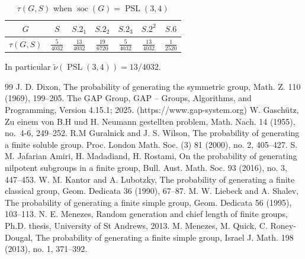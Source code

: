 \documentclass{amsart}
\DeclareMathOperator{\soc}{soc}
\DeclareMathOperator{\psl}{PSL}
\numberwithin{equation}{section}
\begin{document}
\begin{table}[h]
	\centering
	\renewcommand{\arraystretch}{1.4}
	\begin{tabular}{ccccccc}
		\toprule
		\textbf{$G$} & $S$ & $S.{2_1}$ & $S.{2_2}$ & $S.{2_3}$ & $S.2^2$ & $S.6$ \\
		\midrule
		\textbf{$\tau(G,S)$} & $\tfrac{5}{4032}$ & $\tfrac{13}{4032}$ & $\tfrac{19}{6720}$ & $\tfrac{5}{4032}$ & $\tfrac{13}{4032}$ & $\tfrac{1}{2520}$ \\
		\bottomrule
	\end{tabular}
	\caption{$\tau(G,S)$ when $\soc(G)=\psl(3,4)$}
\end{table}

\noindent In particular $\tilde\nu(\psl(3,4))=13/4032.$




	

\begin{thebibliography}{99}
	 J. D. Dixon, The probability of generating the symmetric group, Math.
	Z. 110 (1969), 199–205.
	The GAP Group, GAP -- Groups, Algorithms, and Programming, Version 4.15.1; 2025. (https://www.gap-system.org)
	W. Gasch{\"u}tz, Zu einem von B.H und H. Neumann gestellten
	problem, Math. Nach. 14 (1955), no.~4-6, 249--252.
 R.M	Guralnick and J. S. Wilson, 
	The probability of generating a finite soluble group.
	Proc. London Math. Soc. (3) 81 (2000), no. 2, 405–427.
	 S. M. Jafarian Amiri, H. Madadiand, H.
	Rostami, 
	On the probability of generating nilpotent subgroups in a finite group, 
	Bull. Aust. Math. Soc. 93 (2016), no. 3, 447–453.
	W. M. Kantor and A. Lubotzky, The probability of generating a finite classical group,
	Geom. Dedicata 36 (1990), 67–87.
	M. W. Liebeck and A. Shalev, The probability of generating a finite simple group, Geom.
	Dedicata 56 (1995), 103–113.
 N. E. Menezes, Random generation and chief length of finite groups, Ph.D. thesis, University
of St Andrews, 2013.
 M. Menezes, M. Quick, C. Roney-Dougal,
The probability of generating a finite simple group,
Israel J. Math. 198 (2013), no. 1, 371–392.
	\end{thebibliography}
\end{document}
